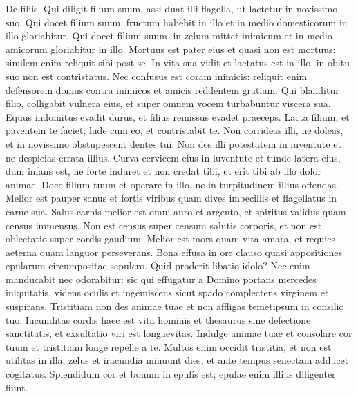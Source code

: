 \begin{biblechapter}  
\verse De filiis. Qui diligit filium suum, assi duat illi flagella, ut laetetur in novissimo suo. 
\verse Qui docet filium suum, fructum habebit in illo et in medio domesticorum in illo gloriabitur. 
\verse Qui docet filium suum, in zelum mittet inimicum et in medio amicorum gloriabitur in illo. 
\verse Mortuus est pater eius et quasi non est mortuus: similem enim reliquit sibi post se. 
\verse In vita sua vidit et laetatus est in illo, in obitu suo non est contristatus. Nec confusus est coram inimicis: 
\verse reliquit enim defensorem domus contra inimicos et amicis reddentem gratiam. 
\verse Qui blanditur filio, colligabit vulnera eius, et super omnem vocem turbabuntur viscera sua. 
\verse Equus indomitus evadit durus, et filius remissus evadet praeceps. 
\verse Lacta filium, et paventem te faciet; lude cum eo, et contristabit te. 
\verse Non corrideas illi, ne doleas, et in novissimo obstupescent dentes tui. 
\verse Non des illi potestatem in iuventute et ne despicias errata illius. 
\verse Curva cervicem eius in iuventute et tunde latera eius, dum infans est, ne forte induret et non credat tibi, et erit tibi ab illo dolor animae. 
\verse Doce filium tuum et operare in illo, ne in turpitudinem illius offendas. 
\verse Melior est pauper sanus et fortis viribus quam dives imbecillis et flagellatus in carne sua. 
\verse Salus carnis melior est omni auro et argento, et spiritus validus quam census immensus. 
\verse Non est census super censum salutis corporis, et non est oblectatio super cordis gaudium. 
\verse Melior est mors quam vita amara, et requies aeterna quam languor perseverans. 
\verse Bona effusa in ore clauso quasi appositiones epularum circumpositae sepulcro. 
\verse Quid proderit libatio idolo? Nec enim manducabit nec odorabitur: 
\verse sic qui effugatur a Domino portans mercedes iniquitatis, 
\verse videns oculis et ingemiscens sicut spado complectens virginem et suspirans. 
\verse Tristitiam non des animae tuae et non affligas temetipsum in consilio tuo. 
\verse Iucunditas cordis haec est vita hominis et thesaurus sine defectione sanctitatis, et exsultatio viri est longaevitas. 
\verse Indulge animae tuae et consolare cor tuum et tristitiam longe repelle a te. 
\verse Multos enim occidit tristitia, et non est utilitas in illa; 
\verse zelus et iracundia minuunt dies, et ante tempus senectam adducet cogitatus. 
\verse Splendidum cor et bonum in epulis est; epulae enim illius diligenter fiunt. 
\end{biblechapter}

